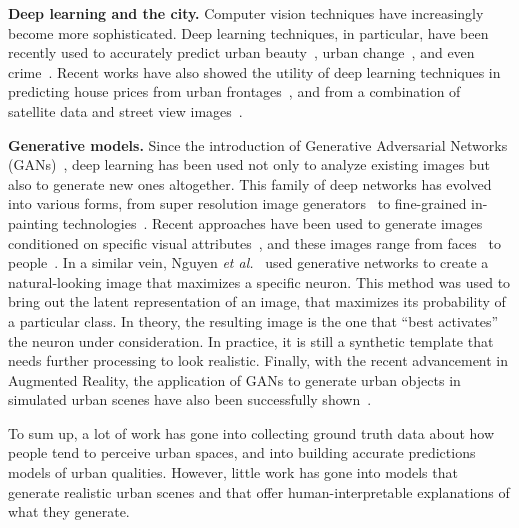 \vspace{4pt}\noindent
\textbf{Deep learning and the city.} Computer vision techniques have increasingly become more sophisticated. Deep learning techniques, in particular, have been recently used to accurately predict urban beauty~\cite{dubey2016deep,seresinhe2017using}, urban change~\cite{naik2017computer}, and even crime~\cite{DeNadai16,arietta2014city}.  Recent works have also showed the utility of deep learning techniques in predicting house prices from urban frontages~\cite{frontage}, and from a combination of satellite data and street view images~\cite{law2018take}.

\vspace{4pt}\noindent
\textbf{Generative models.} Since the introduction of Generative Adversarial Networks (GANs)~\cite{goodfellow2014generative}, deep learning has been used not only to analyze existing images but also to generate new ones altogether. This family of deep networks has evolved into various forms, from super resolution image generators~\cite{ledig2017photo} to fine-grained in-painting technologies~\cite{pathak2016context}. Recent approaches have been used to generate images conditioned on specific visual attributes~\cite{yan2015attribute2image}, and these images range from faces~\cite{taigman2016unsupervised} to people~\cite{ma2018disentangled}. In a similar vein, Nguyen \emph{et al.}~\cite{nguyen2016synthesizing} used generative networks to create a natural-looking image that maximizes a specific neuron. This method was used to bring out the latent representation of an image, that maximizes its probability of a particular class. In theory, the resulting image is the one that ``best activates'' the neuron under consideration. In practice, it is still a synthetic template that needs further processing to look realistic.   Finally, with the recent advancement in Augmented Reality, the application of GANs to generate urban objects in simulated urban scenes have also been successfully shown~\cite{alhaija2018augmented}. 

\vspace{4pt}
To sum up, a lot of work has gone into collecting ground truth data about how people tend to perceive urban spaces, and into building accurate predictions models of urban qualities. However,  little work has gone into models that generate realistic urban scenes and that offer human-interpretable explanations of what they generate. 




